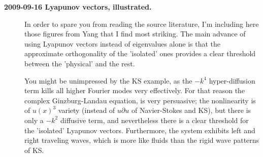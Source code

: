 \begin{description}
\item[\bf 2009-09-16 Lyapunov vectors, illustrated.]
In order to spare you from reading the source literature, I'm including here
those figures from Yang \etal{} that I find most striking.
The main advance of using Lyapunov vectors instead of eigenvalues alone
is that the approximate orthogonality of the 'isolated' ones provides a clear
threshold between the 'physical' and the rest.

You might be unimpressed by the KS example, as the $-k^4$ hyper-diffusion
term kills all higher Fourier modes very effectively. For that reason the
complex Ginzburg-Landau equation, 
is very persuasive; the nonlinearity is
of $u(x)^3$ variety (instead of $u \partial u$ of Navier-Stokes and
KS), but there is only a $-k^2$ diffusive term, and nevertheless there
is a clear threshold for the 'isolated' Lyapunov vectors. Furthermore,
the system exhibits left and right traveling waves, which is more like
fluids than the rigid wave patterns of KS.


\end{description}
